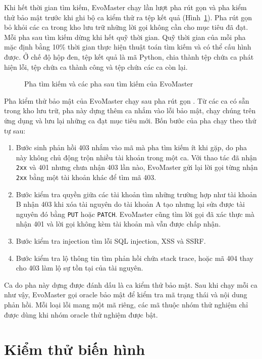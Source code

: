 Khi hết thời gian tìm kiếm, EvoMaster chạy lần lượt pha rút gọn và pha kiểm thử bảo mật trước khi ghi bộ ca kiểm thử ra tệp kết quả (Hình~\ref{fig:evomaster_pipeline}). Pha rút gọn bỏ khỏi các ca trong kho lưu trữ những lời gọi không cần cho mục tiêu đã đạt. Mỗi pha sau tìm kiếm dừng khi hết quỹ thời gian. Quỹ thời gian của mỗi pha mặc định bằng 10\% thời gian thực hiện thuật toán tìm kiếm và có thể cấu hình được. Ở chế độ hộp đen, tệp kết quả là mã Python, chia thành tệp chứa ca phát hiện lỗi, tệp chứa ca thành công và tệp chứa các ca còn lại.

\begin{figure}[htbp]
  \centering
  
  \caption{Pha tìm kiếm và các pha sau tìm kiếm của EvoMaster}
  \label{fig:evomaster_pipeline}
\end{figure}

Pha kiểm thử bảo mật của EvoMaster chạy sau pha rút gọn \cite{sahin2024bola, evomaster611}. Từ các ca có sẵn trong kho lưu trữ, pha này dựng thêm ca nhắm vào lỗi bảo mật, chạy chúng trên ứng dụng và lưu lại những ca đạt mục tiêu mới. Bốn bước của pha chạy theo thứ tự sau:
\begin{enumerate}
  \item Bước sinh phản hồi 403 nhắm vào mã mà pha tìm kiếm ít khi gặp, do pha này không chủ động trộn nhiều tài khoản trong một ca. Với thao tác đã nhận \texttt{2xx} và 401 nhưng chưa nhận 403 lần nào, EvoMaster gửi lại lời gọi từng nhận \texttt{2xx} bằng một tài khoản khác để tìm mã 403.
  \item Bước kiểm tra quyền giữa các tài khoản tìm những trường hợp như tài khoản B nhận 403 khi xóa tài nguyên do tài khoản A tạo nhưng lại sửa được tài nguyên đó bằng \texttt{PUT} hoặc \texttt{PATCH}. EvoMaster cũng tìm lời gọi đã xác thực mà nhận 401 và lời gọi không kèm tài khoản mà vẫn được chấp nhận.
  \item Bước kiểm tra injection tìm lỗi SQL injection, XSS và SSRF.
  \item Bước kiểm tra lộ thông tin tìm phản hồi chứa stack trace, hoặc mã 404 thay cho 403 làm lộ sự tồn tại của tài nguyên.
\end{enumerate}
Ca do pha này dựng được đánh dấu là ca kiểm thử bảo mật. Sau khi chạy mỗi ca như vậy, EvoMaster gọi oracle bảo mật để kiểm tra mã trạng thái và nội dung phản hồi. Mỗi loại lỗi mang một mã riêng, các mã thuộc nhóm thử nghiệm chỉ được dùng khi nhóm oracle thử nghiệm được bật.

\section{Kiểm thử biến hình}
\label{sec:bg_metamorphic}

